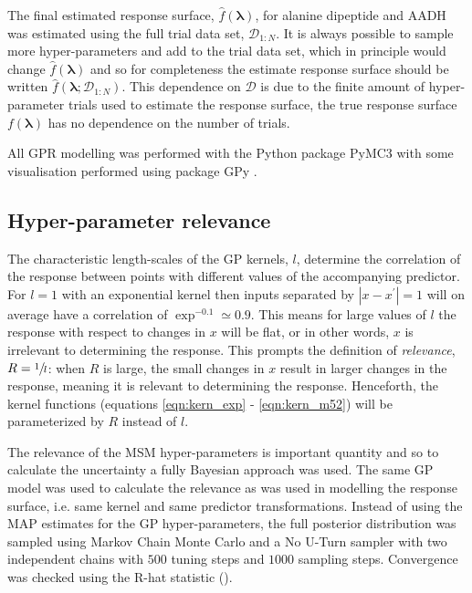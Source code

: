 The final estimated response surface, $\hat{f}(\mathbf{\lambda})$, for alanine dipeptide and AADH was estimated using the full trial data set, $\mathcal{D}_{1:N}$. It is always possible to sample more hyper-parameters and add to the trial data set, which in principle would change $\hat{f}(\mathbf{\lambda})$ and so for completeness the estimate response surface should be written $\hat{f}(\mathbf{\lambda}; \mathcal{D}_{1:N})$. This dependence on $\mathcal{D}$ is due to the finite amount of hyper-parameter trials used to estimate the response surface, the true response surface $f(\mathbf{\lambda})$ has no dependence on the number of trials. 

All GPR modelling was performed with the Python package PyMC3 \cite{salvatierProbabilisticProgrammingPython2016} with some visualisation performed using package GPy \cite{gpy2014}. 

\subsection{Hyper-parameter relevance}\label{subsec:meth_rel}
The characteristic length-scales of the GP kernels, $l$, determine the correlation of the response between points with different values of the accompanying predictor. For $l=1$ with an exponential kernel then inputs separated by $|x-x^{\prime}|= 1$ will on average have a correlation of $\exp^{-0.1}\simeq 0.9$. This means for large values of $l$ the response with respect to changes in $x$ will be flat, or in other words, $x$ is irrelevant to determining the response. This prompts the definition of \emph{relevance}, $R = \sfrac{1}{l}$: when $R$ is large, the small changes in $x$ result in larger changes in the response, meaning it is relevant to determining the response. Henceforth, the kernel functions (equations \ref{eqn:kern_exp} - \ref{eqn:kern_m52}) will be parameterized by $R$ instead of $l$. 

The relevance of the MSM hyper-parameters is important quantity and so to calculate the uncertainty a fully Bayesian approach was used. The same GP model was used to calculate the relevance as was used in modelling the response surface, i.e. same kernel and same predictor transformations. Instead of using the MAP estimates for the GP hyper-parameters, the full posterior distribution was sampled using Markov Chain Monte Carlo and a No U-Turn sampler with two independent chains with $500$ tuning steps and $1000$ sampling steps. Convergence was checked using the R-hat statistic (\cite{gelmanBayesianDataAnalysis2014}). 


